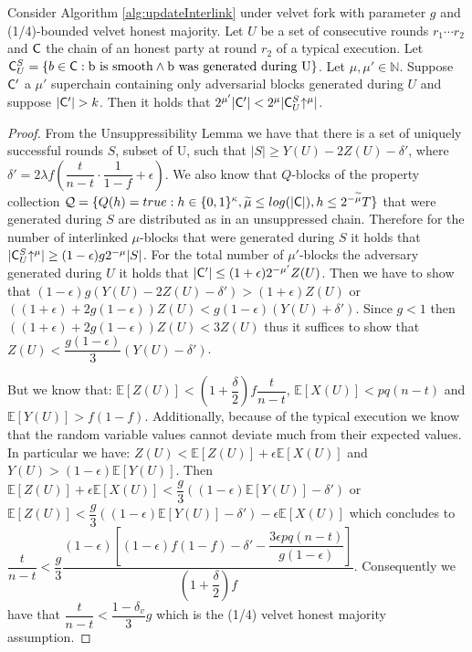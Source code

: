 \begin{lemma}
   Consider Algorithm \ref{alg:updateInterlink} under velvet fork with parameter $g$ and (1/4)-bounded velvet honest majority. Let $U$ be a set of consecutive rounds $r_1 \cdots r_2$ and $\mathsf{C}$ the chain of an honest party at round $r_2$ of a typical execution. Let $\mathsf{C}^S_U = \{b \in \mathsf{C}: \text{b is smooth} \wedge \text{b was generated during U} \}$. Let $\mu, \mu' \in \mathbb{N}$. Suppose $\mathsf{C}'$ a $\mu'$ superchain containing only adversarial blocks generated during $U$ and suppose $\lvert \mathsf{C}' \rvert > k$. Then it holds that $ 2^{\mu'}\lvert \mathsf{C}' \rvert < 2^{\mu}\lvert \mathsf{C}^S_U\negthickspace\uparrow^{\mu} \rvert $.
   \label{lem:claim3_lemma}
\end{lemma}
\begin{proof} From the Unsuppressibility Lemma we have that there is a set of uniquely successful rounds $S$, subset of U, such that $\lvert S \rvert \geq Y(U) - 2Z(U) - \delta'$, where $\delta' = 2 \lambda f (\dfrac{t}{n-t} \cdot \dfrac{1}{1-f} + \epsilon)$. We also know that $Q$-blocks of the property collection $\mathcal{Q} = \{Q(h) = true: h \in \{0,1\}^\kappa, \widetilde{\mu} \leq log(\lvert \mathsf{C} \rvert), h \leq 2^{-\widetilde{\mu}}T \}$ that were generated during $S$ are distributed as in an unsuppressed chain. Therefore for the number of interlinked $\mu$-blocks that were generated during $S$ it holds that  $\lvert \mathsf{C}^S_U\negthickspace\uparrow^{\mu} \rvert \geq (1-\epsilon)g2^{-\mu} \lvert S \rvert$. For the total number of $\mu'$-blocks the adversary generated during $U$ it holds that $\lvert \mathsf{C}' \rvert \leq (1+\epsilon)2^{-\mu'}Z(U)$. Then we have to show that $ (1-\epsilon)g (Y(U) - 2Z(U) - \delta' ) > (1+\epsilon)Z(U)$ or $((1+\epsilon)+2g(1-\epsilon))Z(U) < g(1-\epsilon)(Y(U) + \delta')$. Since $g < 1$ then $((1+\epsilon)+2g(1-\epsilon))Z(U) < 3Z(U)$ thus it suffices to show that $Z(U) < \dfrac{g(1-\epsilon)}{3}(Y(U) - \delta')$.

But we know that\cite{backbone}: $\mathbb{E}[Z(U)] < (1+\dfrac{\delta}{2})f\dfrac{t}{n-t}$, $\mathbb{E}[X(U)] < pq(n-t)$ and $\mathbb{E}[Y(U)] > f(1-f)$. Additionally, because of the typical execution we know that the random variable values cannot deviate much from their expected values. In particular we have\cite{backbone}: $Z(U) < \mathbb{E}[Z(U)] + \epsilon \mathbb{E}[X(U)]$ and $Y(U) > (1-\epsilon)\mathbb{E}[Y(U)]$. Then $\mathbb{E}[Z(U)] + \epsilon\mathbb{E}[X(U)] < \dfrac{g}{3}( (1-\epsilon)\mathbb{E}[Y(U)] -\delta')$ or $\mathbb{E}[Z(U)]  < \dfrac{g}{3}( (1-\epsilon)\mathbb{E}[Y(U)] -\delta') - \epsilon\mathbb{E}[X(U)]$ which concludes to 
$\dfrac{t}{n-t} < \dfrac{g}{3} \dfrac{(1-\epsilon) \left[ (1-\epsilon)f(1-f)-\delta' - \dfrac{3 \epsilon pq(n-t)}{g(1-\epsilon)} \right]}{(1+\dfrac{\delta}{2})f}$.
Consequently we have that $\dfrac{t}{n-t} < \dfrac{1-\delta_v}{3}g$ which is the (1/4) velvet honest majority assumption.
\end{proof}